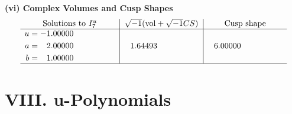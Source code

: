 \documentclass[1p]{elsarticle_modified}
\theoremstyle{definition}
\newcommand{\I}{\sqrt{-1}}
\begin{document}
\newpage\flushleft \textbf{(vi) Complex Volumes and Cusp Shapes}
$$\begin{array}{c|c|c}  
\text{Solutions to }I^u_{7}& \I (\text{vol} + \sqrt{-1}CS) & \text{Cusp shape}\\
 \hline 
\begin{aligned}
u &= -1.00000\phantom{ +0.000000I} \\
a &= \phantom{-}2.00000\phantom{ +0.000000I} \\
b &= \phantom{-}1.00000\phantom{ +0.000000I}\end{aligned}
 & \phantom{-}1.64493\phantom{ +0.000000I} & \phantom{-}6.00000\phantom{ +0.000000I}\\
 \hline 
 \end{array}$$\newpage
\newpage\renewcommand{\arraystretch}{1}
\centering \section*{ VIII. u-Polynomials}
\end{document}
